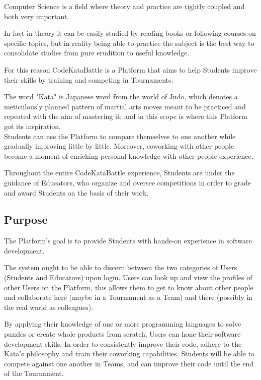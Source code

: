 \setlength{\leftmargini}{5em} %
Computer Science is a field where theory and practice are tightly coupled and both very important. 

In fact in theory it can be easily studied by reading books or following courses on specific topics, but in reality being able to practice the subject is the best way to consolidate studies from pure erudition to useful knowledge.

For this reason CodeKataBattle is a Platform that aims to help Students improve their skills by training and competing in Tournaments.

The word "Kata" is Japanese word from the world of Judo, which denotes a meticulously planned pattern of martial arts moves meant to be practiced and repeated with the aim of mastering it; and in this scope is where this Platform got its inspiration.\\

Students can use the Platform to compare themselves to one another while gradually improving little by little. Moreover, coworking with other people become a moment of enriching personal knowledge with other people experience.

Throughout the entire CodeKataBattle experience, Students are under the guidance of Educators, who organize and oversee competitions in order to grade and award Students on the basis of their work.

\subsection{Purpose}
The Platform's goal is to provide Students with hands-on experience in software development.

The system ought to be able to discern between the two categories of Users (Students and Educators) upon login.
Users can look up and view the profiles of other Users on the Platform, this allows them to get to know about other people and collaborate here (maybe in a Tournament as a Team) and there (possibly in the real world as colleagues).

By applying their knowledge of one or more programming languages to solve puzzles or create whole products from scratch, Users can hone their software development skills. 
In order to consistently improve their code, adhere to the Kata's philosophy and train their coworking capabilities, Students will be able to compete against one another in Teams, and can improve their code until the end of the Tournament.
\\ \\

